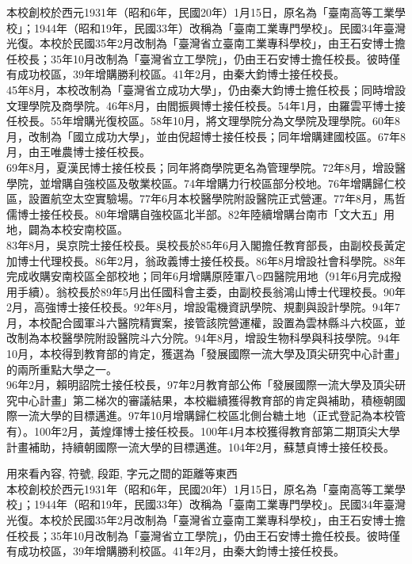 本校創校於西元1931年（昭和6年，民國20年）1月15日，原名為「臺南高等工業學校」；1944年（昭和19年，民國33年）改稱為「臺南工業專門學校」。民國34年臺灣光復。本校於民國35年2月改制為「臺灣省立臺南工業專科學校」，由王石安博士擔任校長；35年10月改制為「臺灣省立工學院」，仍由王石安博士擔任校長。彼時僅有成功校區，39年增購勝利校區。41年2月，由秦大鈞博士接任校長。\\
45年8月，本校改制為「臺灣省立成功大學」，仍由秦大鈞博士擔任校長；同時增設文理學院及商學院。46年8月，由閻振興博士接任校長。54年1月，由羅雲平博士接任校長。55年增購光復校區。58年10月，將文理學院分為文學院及理學院。60年8月，改制為「國立成功大學」，並由倪超博士接任校長；同年增購建國校區。67年8月，由王唯農博士接任校長。\\
69年8月，夏漢民博士接任校長；同年將商學院更名為管理學院。72年8月，增設醫學院，並增購自強校區及敬業校區。74年增購力行校區部分校地。76年增購歸仁校區，設置航空太空實驗場。77年6月本校醫學院附設醫院正式營運。77年8月，馬哲儒博士接任校長。80年增購自強校區北半部。82年陸續增購台南市「文大五」用地，闢為本校安南校區。\\
83年8月，吳京院士接任校長。吳校長於85年6月入閣擔任教育部長，由副校長黃定加博士代理校長。86年2月，翁政義博士接任校長。86年8月增設社會科學院。88年完成收購安南校區全部校地；同年6月增購原陸軍八○四醫院用地（91年6月完成撥用手續）。翁校長於89年5月出任國科會主委，由副校長翁鴻山博士代理校長。90年2月，高強博士接任校長。92年8月，增設電機資訊學院、規劃與設計學院。94年7月，本校配合國軍斗六醫院精實案，接管該院營運權，設置為雲林縣斗六校區，並改制為本校醫學院附設醫院斗六分院。94年8月，增設生物科學與科技學院。94年10月，本校得到教育部的肯定，獲選為「發展國際一流大學及頂尖研究中心計畫」的兩所重點大學之一。\\
96年2月，賴明詔院士接任校長，97年2月教育部公佈「發展國際一流大學及頂尖研究中心計畫」第二梯次的審議結果，本校繼續獲得教育部的肯定與補助，積極朝國際一流大學的目標邁進。97年10月增購歸仁校區北側台糖土地（正式登記為本校管有）。100年2月，黃煌煇博士接任校長。100年4月本校獲得教育部第二期頂尖大學計畫補助，持續朝國際一流大學的目標邁進。104年2月，蘇慧貞博士接任校長。


\newpage
{}
用來看內容, 符號, 段距, 字元之間的距離等東西\\

本校創校於西元1931年（昭和6年，民國20年）1月15日，原名為「臺南高等工業學校」；1944年（昭和19年，民國33年）改稱為「臺南工業專門學校」。民國34年臺灣光復。本校於民國35年2月改制為「臺灣省立臺南工業專科學校」，由王石安博士擔任校長；35年10月改制為「臺灣省立工學院」，仍由王石安博士擔任校長。彼時僅有成功校區，39年增購勝利校區。41年2月，由秦大鈞博士接任校長。\\


